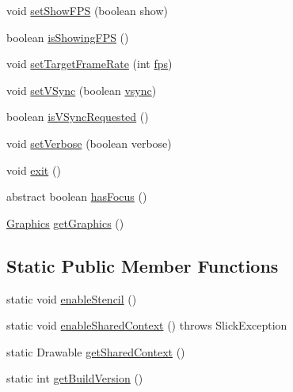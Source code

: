 \begin{DoxyCompactItemize}
void \mbox{\hyperlink{classorg_1_1newdawn_1_1slick_1_1_game_container_aebc1dd5b9cf552bd5c4ff52849920360}{set\+Show\+F\+PS}} (boolean show)
\item 
boolean \mbox{\hyperlink{classorg_1_1newdawn_1_1slick_1_1_game_container_a149e3a3bcbfa6122703db955b47e9a38}{is\+Showing\+F\+PS}} ()
\item 
void \mbox{\hyperlink{classorg_1_1newdawn_1_1slick_1_1_game_container_a223f9078e49a977358a2714c47fc91c3}{set\+Target\+Frame\+Rate}} (int \mbox{\hyperlink{classorg_1_1newdawn_1_1slick_1_1_game_container_aee0fed3a01c1063c678bfb7b1d950aa1}{fps}})
\item 
void \mbox{\hyperlink{classorg_1_1newdawn_1_1slick_1_1_game_container_a2040e2501faab435d19ba4cc412b8c95}{set\+V\+Sync}} (boolean \mbox{\hyperlink{classorg_1_1newdawn_1_1slick_1_1_game_container_a1a1161c9e75a47325ad0256583fee409}{vsync}})
\item 
boolean \mbox{\hyperlink{classorg_1_1newdawn_1_1slick_1_1_game_container_ae73b093fcf68859fd130dde791398615}{is\+V\+Sync\+Requested}} ()
\item 
void \mbox{\hyperlink{classorg_1_1newdawn_1_1slick_1_1_game_container_a9b177f8e7cc67befdd15c2f235dd11fe}{set\+Verbose}} (boolean verbose)
\item 
void \mbox{\hyperlink{classorg_1_1newdawn_1_1slick_1_1_game_container_a6d888463695fe3aac4123e72ac14480f}{exit}} ()
\item 
abstract boolean \mbox{\hyperlink{classorg_1_1newdawn_1_1slick_1_1_game_container_a4fa0f77bdff52d66d2db55d8718b9867}{has\+Focus}} ()
\item 
\mbox{\hyperlink{classorg_1_1newdawn_1_1slick_1_1_graphics}{Graphics}} \mbox{\hyperlink{classorg_1_1newdawn_1_1slick_1_1_game_container_a007825fb0bdfca1bc0e102687387fb59}{get\+Graphics}} ()
\end{DoxyCompactItemize}
\subsection*{Static Public Member Functions}
\begin{DoxyCompactItemize}
\item 
static void \mbox{\hyperlink{classorg_1_1newdawn_1_1slick_1_1_game_container_a5abd71c1092ddc195db5fd775fe7caa7}{enable\+Stencil}} ()
\item 
static void \mbox{\hyperlink{classorg_1_1newdawn_1_1slick_1_1_game_container_a5cc7494b95d6266057fc755a8a4f7e60}{enable\+Shared\+Context}} ()  throws Slick\+Exception 
\item 
static Drawable \mbox{\hyperlink{classorg_1_1newdawn_1_1slick_1_1_game_container_ad4f9b798c9b8fa6d374cc2797447f4e9}{get\+Shared\+Context}} ()
\item 
static int \mbox{\hyperlink{classorg_1_1newdawn_1_1slick_1_1_game_container_a3f678756d7085368d56a710127d7dd67}{get\+Build\+Version}} ()
\end{DoxyCompactItemize}
